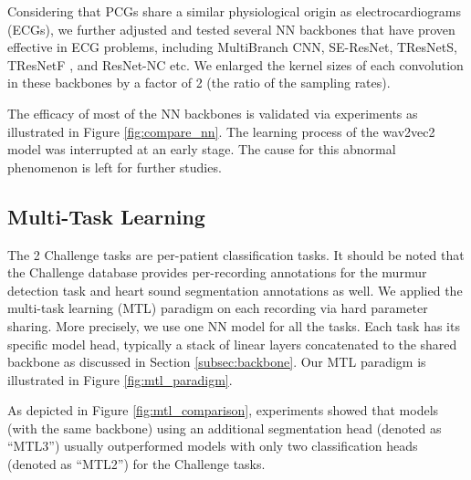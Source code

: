 


Considering that PCGs share a similar physiological origin as electrocardiograms (ECGs), we further adjusted and tested several NN backbones that have proven effective in ECG problems, including MultiBranch CNN, SE-ResNet, TResNetS, TResNetF \cite{Kang_2022_cinc2021_iop}, and ResNet-NC \cite{ribeiro2020automatic} etc. We enlarged the kernel sizes of each convolution in these backbones by a factor of 2 (the ratio of the sampling rates).

The efficacy of most of the NN backbones is validated via experiments as illustrated in Figure \ref{fig:compare_nn}. The learning process of the wav2vec2 model was interrupted at an early stage. The cause for this abnormal phenomenon is left for further studies.



\subsection{Multi-Task Learning}
\label{subsec:mtl}

The 2 Challenge tasks \cite{cinc2022} are per-patient classification tasks. It should be noted that the Challenge database \cite{Oliveira_2021_CirCor} provides per-recording annotations for the murmur detection task and heart sound segmentation annotations as well. We applied the multi-task learning (MTL) paradigm \cite{Caruana_1997_mtl} on each recording via hard parameter sharing. More precisely, we use one NN model for all the tasks. Each task has its specific model head, typically a stack of linear layers concatenated to the shared backbone as discussed in Section \ref{subsec:backbone}. Our MTL paradigm is illustrated in Figure \ref{fig:mtl_paradigm}.



As depicted in Figure \ref{fig:mtl_comparison}, experiments showed that models (with the same backbone) using an additional segmentation head (denoted as ``MTL3'') usually outperformed models with only two classification heads (denoted as ``MTL2'') for the Challenge tasks.



